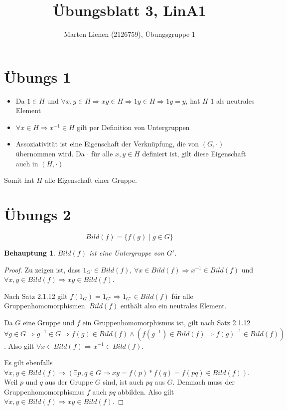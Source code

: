 \documentclass[a4paper,10pt]{article}
\title{Übungsblatt 3, LinA1}
\author{Marten Lienen (2126759), Übungsgruppe 1}
\newtheorem*{claim}{Behauptung}
\begin{document}
\maketitle

\section*{Übungs 1}

\begin{itemize}
 \item Da $1 \in H$ und $\forall x, y \in H \Rightarrow xy \in H \Rightarrow 1y \in H \Rightarrow 1y = y$, hat $H$ $1$ als neutrales Element
 \item $\forall x \in H \Rightarrow x^{-1} \in H$ gilt per Definition von Untergruppen
 \item Assoziativität ist eine Eigenschaft der Verknüpfung, die von $(G, \cdot)$ übernommen wird.
 Da $\cdot$ für alle $x, y \in H$ definiert ist, gilt diese Eigenschaft auch in $(H, \cdot)$
\end{itemize}

Somit hat $H$ alle Eigenschaft einer Gruppe.

\section*{Übungs 2}

\begin{equation*}
 Bild(f) = \{f(g) \mid g \in G\}
\end{equation*}

\begin{claim}
 $Bild(f)$ ist eine Untergruppe von $G'$.
\end{claim}

\begin{proof}
 Zu zeigen ist, dass $1_{G'} \in Bild(f)$, $\forall x \in Bild(f) \Rightarrow x^{-1} \in Bild(f)$ und $\forall x, y \in Bild(f) \Rightarrow xy \in Bild(f)$.
 
 Nach Satz 2.1.12 gilt $f(1_G) = 1_{G'} \Rightarrow 1_{G'} \in Bild(f)$ für alle Gruppenhomomorphismen.
 $Bild(f)$ enthält also ein neutrales Element.
 
 Da $G$ eine Gruppe und $f$ ein Gruppenhomomorphismus ist, gilt nach Satz 2.1.12 $\forall g \in G \Rightarrow g^{-1} \in G \Rightarrow f(g) \in Bild(f) \land (f(g^{-1}) \in Bild(f) \Rightarrow f(g)^{-1} \in Bild(f))$.
 Also gilt $\forall x \in Bild(f) \Rightarrow x^{-1} \in Bild(f)$.
 
 Es gilt ebenfalls $\forall x, y \in Bild(f) \Rightarrow (\exists p, q \in G \Rightarrow xy = f(p) * f(q) = f(pq) \in Bild(f))$.
 Weil $p$ und $q$ aus der Gruppe $G$ sind, ist auch $pq$ aus $G$.
 Demnach muss der Gruppenhomomorphismus $f$ auch $pq$ abbilden.
 Also gilt $\forall x, y \in Bild(f) \Rightarrow xy \in Bild(f)$.
\end{proof}
\end{document}
